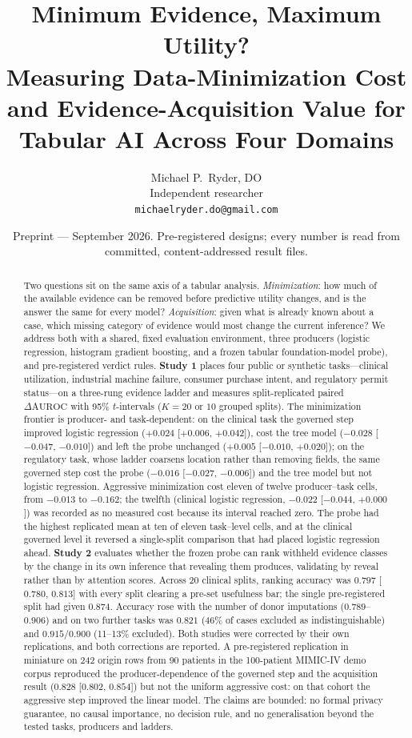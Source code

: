 \documentclass[11pt]{article}
\title{\textbf{Minimum Evidence, Maximum Utility?}\\[4pt]
\large Measuring Data-Minimization Cost and Evidence-Acquisition Value for Tabular AI Across Four Domains}
\author{Michael P.\ Ryder, DO\\ \small Independent researcher \\ \small \texttt{michaelryder.do@gmail.com}}
\date{\small Preprint --- September 2026. Pre-registered designs; every number is read from committed, content-addressed result files.}
\newcommand{\dAUROC}{\ensuremath{\Delta\mathrm{AUROC}}}
\begin{document}
\maketitle

\begin{abstract}
\noindent Two questions sit on the same axis of a tabular analysis. \emph{Minimization}: how much of the available evidence can be removed before predictive utility changes, and is the answer the same for every model? \emph{Acquisition}: given what is already known about a case, which missing category of evidence would most change the current inference? We address both with a shared, fixed evaluation environment, three producers (logistic regression, histogram gradient boosting, and a frozen tabular foundation-model probe), and pre-registered verdict rules. \textbf{Study 1} places four public or synthetic tasks---clinical utilization, industrial machine failure, consumer purchase intent, and regulatory permit status---on a three-rung evidence ladder and measures split-replicated paired \dAUROC{} with 95\% $t$-intervals ($K=20$ or $10$ grouped splits). The minimization frontier is producer- and task-dependent: on the clinical task the governed step improved logistic regression ($+0.024$ [$+0.006$, $+0.042$]), cost the tree model ($-0.028$ [$-0.047$, $-0.010$]) and left the probe unchanged ($+0.005$ [$-0.010$, $+0.020$]); on the regulatory task, whose ladder coarsens location rather than removing fields, the same governed step cost the probe ($-0.016$ [$-0.027$, $-0.006$]) and the tree model but not logistic regression. Aggressive minimization cost eleven of twelve producer--task cells, from $-0.013$ to $-0.162$; the twelfth (clinical logistic regression, $-0.022$ [$-0.044$, $+0.000$]) was recorded as no measured cost because its interval reached zero. The probe had the highest replicated mean at ten of eleven task--level cells, and at the clinical governed level it reversed a single-split comparison that had placed logistic regression ahead. \textbf{Study 2} evaluates whether the frozen probe can rank withheld evidence classes by the change in its own inference that revealing them produces, validating by reveal rather than by attention scores. Across 20 clinical splits, ranking accuracy was $0.797$ [$0.780$, $0.813$] with every split clearing a pre-set usefulness bar; the single pre-registered split had given $0.874$. Accuracy rose with the number of donor imputations ($0.789$--$0.906$) and on two further tasks was $0.821$ (46\% of cases excluded as indistinguishable) and $0.915$/$0.900$ (11--13\% excluded). Both studies were corrected by their own replications, and both corrections are reported. A pre-registered replication in miniature on 242 origin rows from 90 patients in the 100-patient MIMIC-IV demo corpus reproduced the producer-dependence of the governed step and the acquisition result ($0.828$ [$0.802$, $0.854$]) but not the uniform aggressive cost: on that cohort the aggressive step improved the linear model. The claims are bounded: no formal privacy guarantee, no causal importance, no decision rule, and no generalisation beyond the tested tasks, producers and ladders.
\end{abstract}
\end{document}
